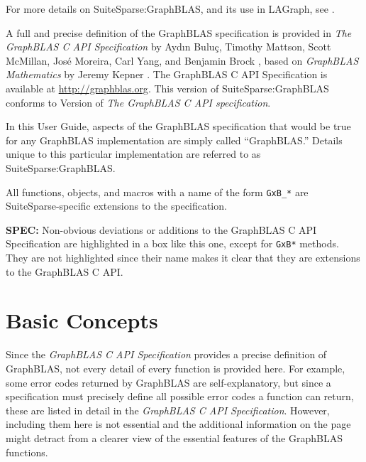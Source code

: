 \documentclass[12pt]{article}
\begin{document}
For more details on SuiteSparse:GraphBLAS, and its use in LAGraph, see
\cite{Davis19,Davis22,Davis18b,DavisAznavehKolodziej19,Davis20,Mattson19}.

A full and precise definition of the GraphBLAS specification is provided in
{\em The GraphBLAS C API Specification} by {Ayd\i n Bulu\c{c}, Timothy Mattson,
Scott McMillan, Jos\'e Moreira, Carl Yang, and Benjamin Brock}
\cite{BulucMattsonMcMillanMoreiraYang17,spec,spec2}, based on {\em GraphBLAS
Mathematics} by Jeremy Kepner \cite{Kepner2017}.  The GraphBLAS C API
Specification is available at \url{http://graphblas.org}.
This version of SuiteSparse:GraphBLAS conforms to Version
 of {\em The GraphBLAS C API specification}.

In this User Guide, aspects of the GraphBLAS specification that would be true
for any GraphBLAS implementation are simply called ``GraphBLAS.'' Details
unique to this particular implementation are referred to as
SuiteSparse:GraphBLAS.

All functions, objects, and macros with a name of the form \verb'GxB_*' are
SuiteSparse-specific extensions to the specification.

\begin{alert}
{\bf SPEC:} Non-obvious deviations or additions to the GraphBLAS C API
Specification are highlighted in a box like this one, except for \verb'GxB*'
methods.  They are not highlighted since their name makes it clear that they
are extensions to the GraphBLAS C API.
\end{alert}


\newpage
\section{Basic Concepts} %
\label{basic}

Since the {\em GraphBLAS C API Specification} provides a precise definition of
GraphBLAS, not every detail of every function is provided here.  For example,
some error codes returned by GraphBLAS are self-explanatory, but since a
specification must precisely define all possible error codes a function can
return, these are listed in detail in the {\em GraphBLAS C API Specification}.
However, including them here is not essential and the additional information on
the page might detract from a clearer view of the essential features of the
GraphBLAS functions.
\end{document}
